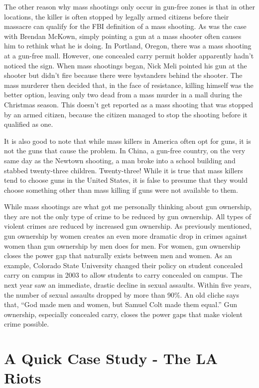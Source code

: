 The other reason why mass shootings only occur in gun-free zones is that
in other locations, the killer is often stopped by legally armed
citizens before their massacre can qualify for the FBI definition of a
mass shooting.  As was the case with Brendan McKown, simply pointing a
gun at a mass shooter often causes him to rethink what he is doing. In
Portland, Oregon, there was a mass shooting at a gun-free mall.
However, one concealed carry permit holder apparently hadn’t noticed
the sign. When mass shootings began, Nick Meli pointed his gun at the
shooter but didn’t fire because there were bystanders behind the
shooter. The mass murderer then decided that, in the face of
resistance, killing himself was the better option, leaving only two
dead from a mass murder in a mall during the Christmas season.  This
doesn't get reported as a mass shooting that was
stopped by an armed citizen, because the citizen managed to stop the
shooting before it qualified as one.

It is also good to note that while mass killers in America often opt for
guns, it is not the guns that cause the problem. In China, a gun-free
country, on the very same day as the Newtown shooting, a man broke into
a school building and stabbed twenty-three children. Twenty-three! 
While it is true that mass killers tend to choose guns in the United
States, it is false to presume that they would choose something other
than mass killing if guns were not available to them.

While mass shootings are what got me personally thinking about gun
ownership, they are not the only type of crime to be reduced by gun
ownership. All types of violent crimes are reduced by increased gun
ownership. As
previously mentioned, gun ownership by women creates an even more
dramatic drop in crimes against women than gun ownership by men does
for men. For women,
gun ownership closes the power gap that naturally exists between men
and women.  
As an example, Colorado State University changed their policy on student concealed 
carry on campus in 2003 to allow students to carry concealed on campus.  The next year saw an immediate, drastic decline
in sexual assaults.  Within five years, the number of sexual assaults
dropped by more than 90\%.  
An old cliche says that, “God made men and women, but
Samuel Colt made them equal.”  Gun ownership, especially concealed
carry, closes the power gaps that make violent crime possible.  

\section{A Quick Case Study - The LA Riots}

